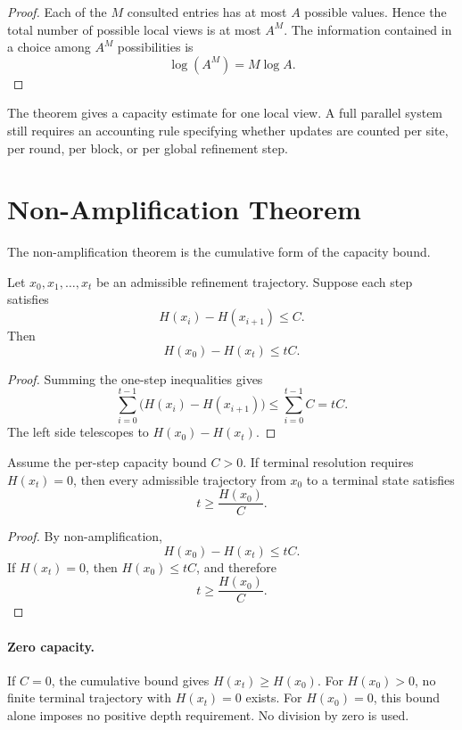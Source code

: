 \begin{proof}
Each of the \(M\) consulted entries has at most \(A\) possible values. Hence
the total number of possible local views is at most \(A^M\). The information
contained in a choice among \(A^M\) possibilities is
\[
\log(A^M)=M\log A.
\]
\end{proof}

\begin{remark}
The theorem gives a capacity estimate for one local view. A full parallel
system still requires an accounting rule specifying whether updates are
counted per site, per round, per block, or per global refinement step.
\end{remark}

\section{Non-Amplification Theorem}

The non-amplification theorem is the cumulative form of the capacity bound.

\begin{theorem}
Let \(x_0,x_1,\ldots,x_t\) be an admissible refinement trajectory. Suppose
each step satisfies
\[
H(x_i)-H(x_{i+1})\le C.
\]
Then
\[
H(x_0)-H(x_t)\le tC.
\]
\end{theorem}

\begin{proof}
Summing the one-step inequalities gives
\[
\sum_{i=0}^{t-1}\bigl(H(x_i)-H(x_{i+1})\bigr)\le \sum_{i=0}^{t-1}C=tC.
\]
The left side telescopes to \(H(x_0)-H(x_t)\).
\end{proof}

\begin{theorem}
Assume the per-step capacity bound \(C>0\). If terminal resolution requires \(H(x_t)=0\), then every admissible trajectory
from \(x_0\) to a terminal state satisfies
\[
t\ge \frac{H(x_0)}{C}.
\]
\end{theorem}

\begin{proof}
By non-amplification,
\[
H(x_0)-H(x_t)\le tC.
\]
If \(H(x_t)=0\), then \(H(x_0)\le tC\), and therefore
\[
t\ge \frac{H(x_0)}{C}.
\]
\end{proof}

\paragraph{Zero capacity.} If \(C=0\), the cumulative bound gives \(H(x_t)\ge H(x_0)\). For \(H(x_0)>0\), no finite terminal trajectory with \(H(x_t)=0\) exists. For \(H(x_0)=0\), this bound alone imposes no positive depth requirement. No division by zero is used.

